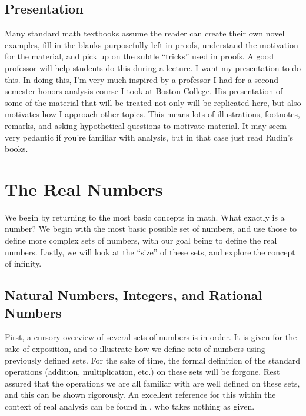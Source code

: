 \documentclass{article}
\theoremstyle{definition}
\begin{document}
	
	
	\subsection{Presentation}
	Many standard math textbooks assume the reader can create their own novel examples, fill in the blanks purposefully left in proofs, understand the motivation for the material, and pick up on the subtle ``tricks'' used in proofs. A good professor will help students do this during a lecture. I want my presentation to do this. In doing this, I'm very much inspired by a professor I had for a second semester honors analysis course I took at Boston College. His presentation of some of the material that will be treated not only will be replicated here, but also motivates how I approach other topics. This means lots of illustrations, footnotes, remarks, and asking hypothetical questions to motivate material. It may seem very pedantic if you're familiar with analysis, but in that case just read Rudin's books. 
	\newpage
	\section{The Real Numbers}
	We begin by returning to the most basic concepts in math. What exactly is a number? We begin with the most basic possible set of numbers, and use those to define more complex sets of numbers, with our goal being to define the real numbers. Lastly, we will look at the ``size'' of these sets, and explore the concept of infinity. 
	\subsection{Natural Numbers, Integers, and Rational Numbers}
	First, a cursory overview of several sets of numbers is in order. It is given for the sake of exposition, and to illustrate how we define sets of numbers using previously defined sets. For the sake of time, the formal definition of the standard operations (addition, multiplication, etc.) on these sets will be forgone. Rest assured that the operations we are all familiar with are well defined on these sets, and this can be shown rigorously. An excellent reference for this within the context of real analysis can be found in \cite{tao2006analysis}, who takes nothing as given. 
	
\end{document}

